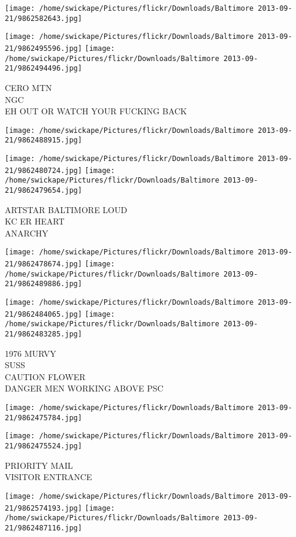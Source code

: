 \documentclass[10pt,letterpaper]{article}
\begin{document}
\texttt{[image: /home/swickape/Pictures/flickr/Downloads/Baltimore 2013-09-21/9862582643.jpg]}

\vspace{0.25in}
\texttt{[image: /home/swickape/Pictures/flickr/Downloads/Baltimore 2013-09-21/9862495596.jpg]}
\texttt{[image: /home/swickape/Pictures/flickr/Downloads/Baltimore 2013-09-21/9862494496.jpg]}

CERO MTN\\
NGC\\
EH OUT OR WATCH YOUR FUCKING BACK
\pagebreak

\texttt{[image: /home/swickape/Pictures/flickr/Downloads/Baltimore 2013-09-21/9862488915.jpg]}

\vspace{0.25in}
\texttt{[image: /home/swickape/Pictures/flickr/Downloads/Baltimore 2013-09-21/9862480724.jpg]}
\texttt{[image: /home/swickape/Pictures/flickr/Downloads/Baltimore 2013-09-21/9862479654.jpg]}

ARTSTAR BALTIMORE LOUD\\
KC ER HEART\\
ANARCHY
\pagebreak

\texttt{[image: /home/swickape/Pictures/flickr/Downloads/Baltimore 2013-09-21/9862478674.jpg]}
\texttt{[image: /home/swickape/Pictures/flickr/Downloads/Baltimore 2013-09-21/9862489886.jpg]}

\texttt{[image: /home/swickape/Pictures/flickr/Downloads/Baltimore 2013-09-21/9862484065.jpg]}
\texttt{[image: /home/swickape/Pictures/flickr/Downloads/Baltimore 2013-09-21/9862483285.jpg]}

1976 MURVY\\
SUSS\\
CAUTION FLOWER\\
DANGER MEN WORKING ABOVE PSC
\pagebreak

\texttt{[image: /home/swickape/Pictures/flickr/Downloads/Baltimore 2013-09-21/9862475784.jpg]}

\vspace{0.25in}
\texttt{[image: /home/swickape/Pictures/flickr/Downloads/Baltimore 2013-09-21/9862475524.jpg]}

PRIORITY MAIL\\
VISITOR ENTRANCE
\pagebreak

\texttt{[image: /home/swickape/Pictures/flickr/Downloads/Baltimore 2013-09-21/9862574193.jpg]}
\texttt{[image: /home/swickape/Pictures/flickr/Downloads/Baltimore 2013-09-21/9862487116.jpg]}
\end{document}
